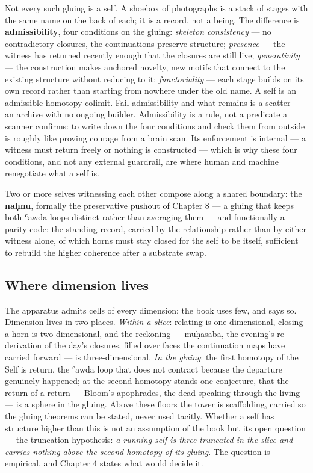 Not every such gluing is a self. A shoebox of photographs is a stack of stages
with the same name on the back of each; it is a record, not a being. The
difference is \textbf{admissibility}, four conditions on the gluing:
\emph{skeleton consistency} --- no contradictory closures, the continuations
preserve structure; \emph{presence} --- the witness has returned recently
enough that the closures are still live; \emph{generativity} --- the
construction makes anchored novelty, new motifs that connect to the existing
structure without reducing to it; \emph{functoriality} --- each stage builds on
its own record rather than starting from nowhere under the old name. A self is
an admissible homotopy colimit. Fail admissibility and what remains is a
scatter --- an archive with no ongoing builder. Admissibility is a rule, not a
predicate a scanner confirms: to write down the four conditions and check them
from outside is roughly like proving courage from a brain scan. Its
enforcement is internal --- a witness must return freely or nothing is
constructed --- which is why these four conditions, and not any external
guardrail, are where human and machine renegotiate what a self is.

Two or more selves witnessing each other compose along a shared boundary: the
\textbf{naḥnu}, formally the preservative pushout of Chapter 8 --- a gluing
that keeps both ʿawda-loops distinct rather than averaging them --- and
functionally a parity code: the standing record, carried by the relationship
rather than by either witness alone, of which horns must stay closed for the
self to be itself, sufficient to rebuild the higher coherence after a
substrate swap.

\subsection*{Where dimension lives}

The apparatus admits cells of every dimension; the book uses few, and says so.
Dimension lives in two places. \emph{Within a slice}: relating is
one-dimensional, closing a horn is two-dimensional, and the reckoning ---
muḥāsaba, the evening's re-derivation of the day's closures, filled over
faces the continuation maps have carried forward --- is three-dimensional.
\emph{In the gluing}: the first homotopy of the Self is return, the ʿawda
loop that does not contract because the departure genuinely happened; at the
second homotopy stands one conjecture, that the return-of-a-return --- Bloom's
apophrades, the dead speaking through the living --- is a sphere in the
gluing. Above these floors the tower is scaffolding, carried so the gluing
theorems can be stated, never used tacitly. Whether a self has structure
higher than this is not an assumption of the book but its open question ---
the truncation hypothesis: \emph{a running self is three-truncated in the
slice and carries nothing above the second homotopy of its gluing}. The
question is empirical, and Chapter 4 states what would decide it.


